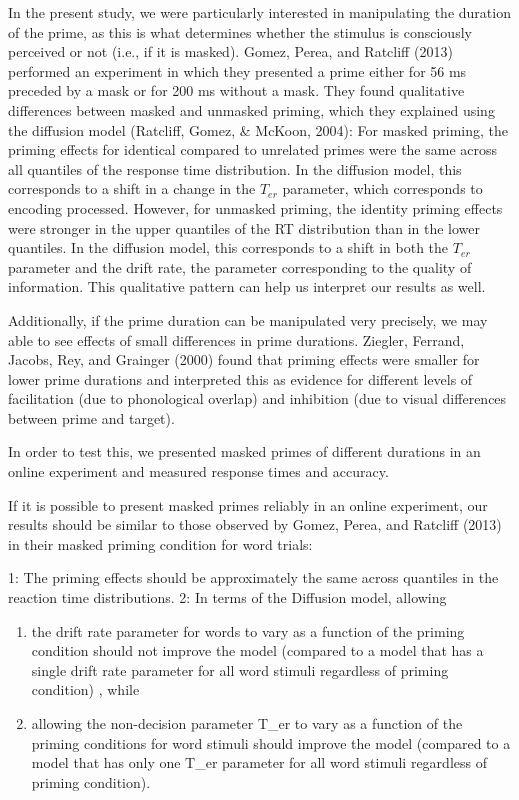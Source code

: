 \documentclass[
  english,
  man]{apa6}
\begin{document}
In the present study, we were particularly interested in manipulating the duration of the prime, as this is what determines whether the stimulus is consciously perceived or not (i.e., if it is masked). Gomez, Perea, and Ratcliff (2013) performed an experiment in which they presented a prime either for 56 ms preceded by a mask or for 200 ms without a mask. They found qualitative differences between masked and unmasked priming, which they explained using the diffusion model (Ratcliff, Gomez, \& McKoon, 2004): For masked priming, the priming effects for identical compared to unrelated primes were the same across all quantiles of the response time distribution. In the diffusion model, this corresponds to a shift in a change in the \(T_{er}\) parameter, which corresponds to encoding processed. However, for unmasked priming, the identity priming effects were stronger in the upper quantiles of the RT distribution than in the lower quantiles. In the diffusion model, this corresponds to a shift in both the \(T_{er}\) parameter and the drift rate, the parameter corresponding to the quality of information. This qualitative pattern can help us interpret our results as well.

Additionally, if the prime duration can be manipulated very precisely, we may able to see effects of small differences in prime durations. Ziegler, Ferrand, Jacobs, Rey, and Grainger (2000) found that priming effects were smaller for lower prime durations and interpreted this as evidence for different levels of facilitation (due to phonological overlap) and inhibition (due to visual differences between prime and target).

In order to test this, we presented masked primes of different durations in an online experiment and measured response times and accuracy.

If it is possible to present masked primes reliably in an online experiment, our results should be similar to those observed by Gomez, Perea, and Ratcliff (2013) in their masked priming condition for word trials:

1: The priming effects should be approximately the same across quantiles in the reaction time distributions. 2: In terms of the Diffusion model, allowing

\begin{enumerate}
\def\labelenumi{\alph{enumi})}
\item
  the drift rate parameter for words to vary as a function of the priming condition should not improve the model (compared to a model that has a single drift rate parameter for all word stimuli regardless of priming condition) , while
\item
  allowing the non-decision parameter T\_er to vary as a function of the priming conditions for word stimuli should improve the model (compared to a model that has only one T\_er parameter for all word stimuli regardless of priming condition).
\end{enumerate}
\end{document}
